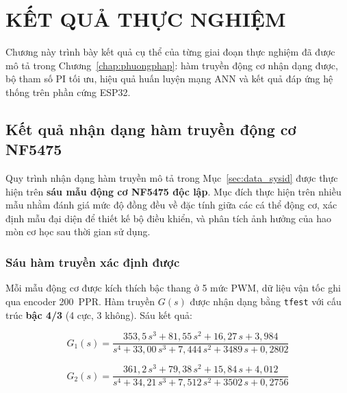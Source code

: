 
\chapter{KẾT QUẢ THỰC NGHIỆM}
\label{chap:ketqua}

Chương này trình bày kết quả cụ thể của từng giai đoạn thực nghiệm đã được mô tả
trong Chương~\ref{chap:phuongphap}: hàm truyền động cơ nhận dạng được, bộ tham số
PI tối ưu, hiệu quả huấn luyện mạng ANN và kết quả đáp ứng hệ thống trên phần cứng
ESP32.


\section{Kết quả nhận dạng hàm truyền động cơ NF5475}
\label{sec:result_tf}

Quy trình nhận dạng hàm truyền mô tả trong Mục~\ref{sec:data_sysid} được thực hiện
trên \textbf{sáu mẫu động cơ NF5475 độc lập}. Mục đích thực hiện trên nhiều mẫu nhằm
đánh giá mức độ đồng đều về đặc tính giữa các cá thể động cơ, xác định mẫu đại diện
để thiết kế bộ điều khiển, và phân tích ảnh hưởng của hao mòn cơ học sau thời gian
sử dụng.

\subsection{Sáu hàm truyền xác định được}
\label{subsec:six_tf}

Mỗi mẫu động cơ được kích thích bậc thang ở 5 mức PWM, dữ liệu vận tốc ghi qua
encoder 200~PPR. Hàm truyền $G(s)$ được nhận dạng bằng \texttt{tfest} với cấu trúc
\textbf{bậc 4/3} (4 cực, 3 không). Sáu kết quả:

\begin{equation}
    G_1(s) = \frac{353{,}5\,s^3 + 81{,}55\,s^2 + 16{,}27\,s + 3{,}984}
                  {s^4 + 33{,}00\,s^3 + 7{,}444\,s^2 + 3489\,s + 0{,}2802}
    \label{eq:tf1}
\end{equation}

\begin{equation}
    G_2(s) = \frac{361{,}2\,s^3 + 79{,}38\,s^2 + 15{,}84\,s + 4{,}012}
                  {s^4 + 34{,}21\,s^3 + 7{,}512\,s^2 + 3502\,s + 0{,}2756}
    \label{eq:tf2}
\end{equation}

